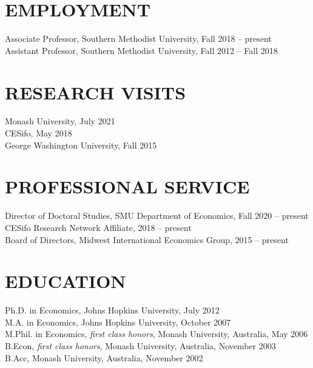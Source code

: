 \documentclass[11pt]{res}
\begin{document}
\begin{resume}
\hspace{-0.5in}\makebox[6.1in]{\hrulefill}

\section{EMPLOYMENT} \vspace{1.5mm}
Associate Professor, Southern Methodist University, Fall 2018 -- present\\
Assistant Professor, Southern Methodist University, Fall 2012 -- Fall 2018

\section{RESEARCH VISITS} \vspace{1.5mm}
Monash University, July 2021\vspace{1.5mm}\\
CESifo, May 2018\vspace{1.5mm}\\
George Washington University, Fall 2015

\section{PROFESSIONAL SERVICE} \vspace{1.5mm}
Director of Doctoral Studies, SMU Department of Economics, Fall 2020 -- present\\
CESifo Research Network Affiliate, 2018 --  present\\
Board of Directors, Midwest International Economics Group, 2015 -- present

\section{EDUCATION} \vspace{1.5mm}
Ph.D. in Economics, Johns Hopkins University, July 2012 \vspace{1.5mm}\\
M.A. in Economics, Johns Hopkins University, October 2007\vspace{1.5mm}\\
M.Phil. in Economics, \emph{first class honors}, Monash University, Australia, May 2006\vspace{1.5mm}\\
B.Econ, \emph{first class honors}, Monash University, Australia, November 2003\vspace{1.5mm}\\
B.Acc, Monash University, Australia, November 2002


\end{resume}
\end{document}
